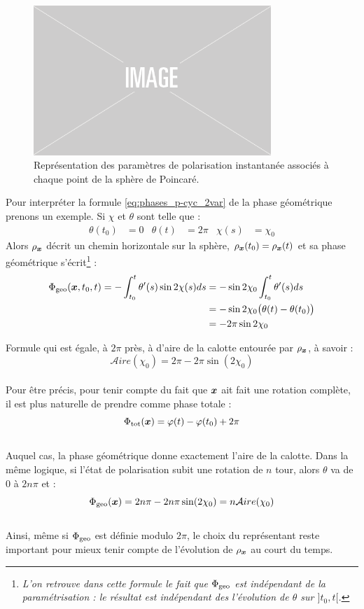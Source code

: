 \begin{figure}[h]
	\includegraphics[width=0.8\textwidth]{fig/placeholder}
	\caption{Représentation des paramètres de polarisation instantanée associés à chaque point de la sphère de Poincaré.}
\end{figure}


Pour interpréter la formule \eqref{eq:phases_p-cyc_2var} de la phase géométrique prenons un exemple. Si $\chi$ et $\theta$ sont telle que :
\begin{align*}
	\theta(t_0) &= 0  &  \theta(t) &= 2\pi  &  \chi(s) &= \chi_0
\end{align*}
Alors $\rho_{\boldsymbol{x}}$ décrit un chemin horizontale sur la sphère, $\rho_{\boldsymbol{x}}(t_0) = \rho_{\boldsymbol{x}}(t)$ et sa phase géométrique s'écrit\footnote{\itshape 
	L'on retrouve dans cette formule le fait que $\Phi_{\text{\normalfont geo}}$ est indépendant de la paramétrisation : le résultat est indépendant des l'évolution de $\theta$ sur $]t_0,t[$.} :
\begin{align*}
	\Phi_{\text{\normalfont geo}}(\boldsymbol{x}, t_0, t) = -\int_{t_0}^t \theta'(s) \sin 2\chi(s) ds &= - \sin 2\chi_0 \int_{t_0}^t \theta'(s) ds \\
	&= - \sin 2\chi_0 \big( \theta(t) - \theta(t_0)\big) \\
	&= - 2\pi\sin 2\chi_0
\end{align*}
\skipl

Formule qui est égale, à $2\pi$ près, à d'aire de la calotte entourée par $\rho_{\boldsymbol{x}}$, à savoir :
\[\mathcal{A}ire(\chi_0) = 2\pi - 2\pi \sin(2\chi_0)\]
\\
Pour être précis, pour tenir compte du fait que $\boldsymbol{x}$ ait fait une rotation complète, il est plus naturelle de prendre comme phase totale :
\[\Phi_{\text{\normalfont tot}}(\boldsymbol{x}) = \varphi(t) - \varphi(t_0) + 2\pi\]
\\
Auquel cas, la phase géométrique donne exactement l'aire de la calotte. Dans la même logique, si l'état de polarisation subit une rotation de $n$ tour, alors $\theta$ va de $0$ à $2n\pi$ et :
\[\Phi_{\text{\normalfont geo}}(\boldsymbol{x}) = 2n\pi - 2n\pi\sin(2\chi_0) = n\mathcal{A}ire(\chi_0)\]
\\
Ainsi, même si $\Phi_{\text{\normalfont geo}}$ est définie modulo $2\pi$, le choix du représentant reste important pour mieux tenir compte de l'évolution de $\rho_{\boldsymbol{x}}$ au court du temps.
\\

